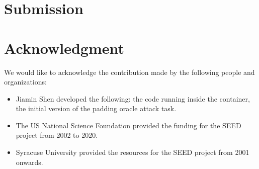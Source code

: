 \section{Submission}





\section{Acknowledgment}

We would like to acknowledge the contribution made by the following people and organizations:

\begin{itemize}
\item Jiamin Shen developed the following: the code running inside the container, 
      the initial version of the padding oracle attack task. 

\item The US National Science Foundation provided the funding for the SEED project from 2002 
      to 2020.

\item Syracuse University provided the resources for the SEED project from 2001 onwards.
\end{itemize}







